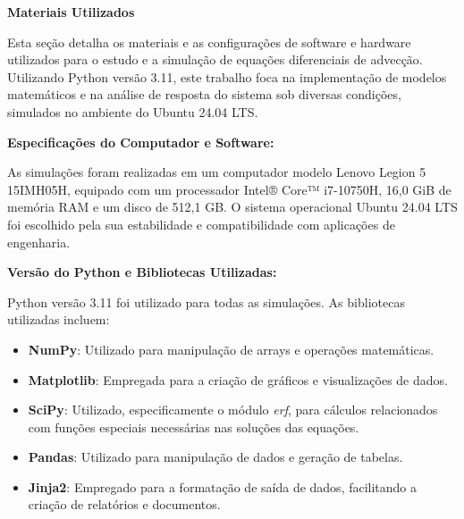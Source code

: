 \begin{titlepage}
    \thispagestyle{empty} %

    \noindent\textbf{\Large Materiais Utilizados}

    \vspace{1cm} %

    Esta seção detalha os materiais e as configurações de software e hardware utilizados para o estudo e a simulação de equações diferenciais de advecção. Utilizando Python versão 3.11, este trabalho foca na implementação de modelos matemáticos e na análise de resposta do sistema sob diversas condições, simulados no ambiente do Ubuntu 24.04 LTS.

    \vspace{0.3cm} %

    \textbf{Especificações do Computador e Software:}

    As simulações foram realizadas em um computador modelo Lenovo Legion 5 15IMH05H, equipado com um processador Intel® Core™ i7-10750H, 16,0 GiB de memória RAM e um disco de 512,1 GB. O sistema operacional Ubuntu 24.04 LTS foi escolhido pela sua estabilidade e compatibilidade com aplicações de engenharia.

    \vspace{0.3cm} %

    \textbf{Versão do Python e Bibliotecas Utilizadas:}

    Python versão 3.11 foi utilizado para todas as simulações. As bibliotecas utilizadas incluem:
    \begin{itemize}
        \item \textbf{NumPy}: Utilizado para manipulação de arrays e operações matemáticas.
        \item \textbf{Matplotlib}: Empregada para a criação de gráficos e visualizações de dados.
        \item \textbf{SciPy}: Utilizado, especificamente o módulo \textit{erf}, para cálculos relacionados com funções especiais necessárias nas soluções das equações.
        \item \textbf{Pandas}: Utilizado para manipulação de dados e geração de tabelas.
        \item \textbf{Jinja2}: Empregado para a formatação de saída de dados, facilitando a criação de relatórios e documentos.
    \end{itemize}

\end{titlepage}
